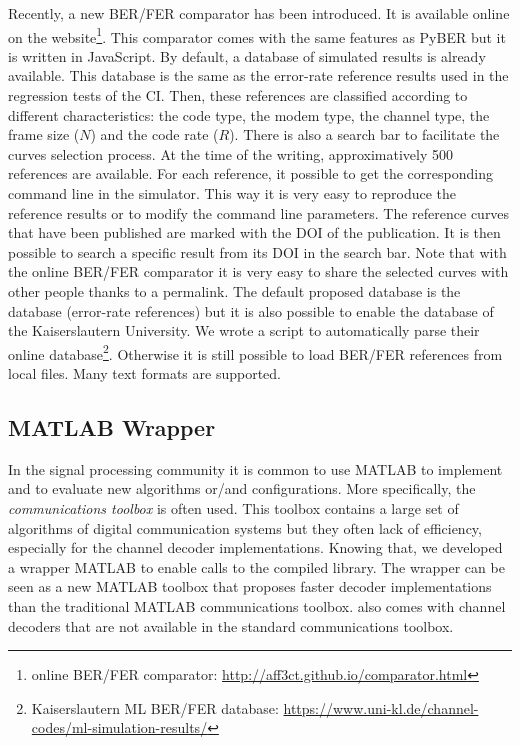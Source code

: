 Recently, a new BER/FER comparator has been introduced. It is available online
on the \AFFECT website\footnote{\AFFECT online BER/FER comparator:
\url{http://aff3ct.github.io/comparator.html}}. This comparator comes with the
same features as PyBER but it is written in JavaScript. By default, a database
of \AFFECT simulated results is already available. This database is the same as
the error-rate reference results used in the regression tests of the CI.
Then, these references are classified according to different characteristics:
the code type, the modem type, the channel type, the frame size ($N$) and the
code rate ($R$). There is also a search bar to facilitate the curves selection
process. At the time of the writing, approximatively 500 references are
available. For each reference, it possible to get the corresponding command line
in the \AFFECT simulator. This way it is very easy to reproduce the reference
results or to modify the command line parameters. The reference curves that have
been published are marked with the DOI of the publication. It is then possible
to search a specific result from its DOI in the search bar. Note that with the
online BER/FER comparator it is very easy to share the selected curves with
other people thanks to a permalink. The default proposed database is the
\AFFECT database (error-rate references) but it is also possible to enable the
database of the Kaiserslautern University. We wrote a script to automatically
parse their online database\footnote{Kaiserslautern ML BER/FER database:
\url{https://www.uni-kl.de/channel-codes/ml-simulation-results/}}. Otherwise it
is still possible to load BER/FER references from local files. Many text formats
are supported.

\subsection{MATLAB Wrapper}

In the signal processing community it is common to use MATLAB to implement and
to evaluate new algorithms or/and configurations. More specifically, the
\emph{communications toolbox} is often used. This toolbox contains a large set
of algorithms of digital communication systems but they often lack of
efficiency, especially for the channel decoder implementations. Knowing that,
we developed a wrapper MATLAB to enable calls to the compiled \AFFECT library.
The wrapper can be seen as a new MATLAB toolbox that proposes faster decoder
implementations than the traditional MATLAB communications toolbox. \AFFECT
also comes with channel decoders that are not available in the standard
communications toolbox.

